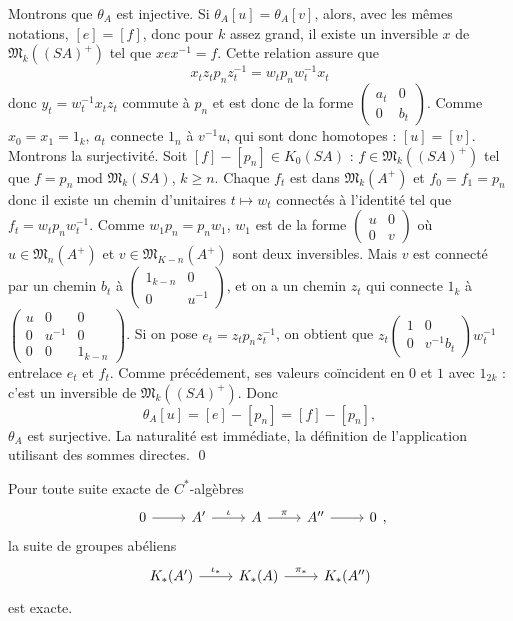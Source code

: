 \begin{dem}
Montrons que $\theta_A$ est injective. Si $\theta_A [u]=\theta_A [v]$, alors, avec les mêmes notations, $[e]=[f]$, donc pour $k$ assez grand, il existe un inversible $x$ de $\mathfrak M_k((SA)^+)$ tel que $xex^{-1}=f$. Cette relation assure que 
\[ x_t z_t p_n z_t^{-1}  = w_t p_n w_t^{-1} x_t \]
donc $y_t= w_t^{-1} x_t z_t $ commute à $p_n$ et est donc de la forme $\begin{pmatrix} a_t & 0 \\ 0 & b_t\end{pmatrix}$. Comme $x_0=x_1=1_k$, $a_t$ connecte $1_n$ à $v^{-1} u$, qui sont donc homotopes : $[u]=[v]$.\\

Montrons la surjectivité. Soit $[f]-[p_n]\in K_0(SA)$ : $f\in \mathfrak M_k ((SA)^+)$ tel que $f=p_n \ \text{mod } \mathfrak M_k(SA)$, $k\geq n$. Chaque $f_t$ est dans $\mathfrak M_k(A^+)$ et $f_0=f_1=p_n$ donc il existe un chemin d'unitaires $t \mapsto w_t$ connectés à l'identité tel que $f_t = w_t p_n w^{-1}_t$. Comme $w_1 p_n = p_n w_1$, $w_1$ est de la forme $\begin{pmatrix}u & 0\\ 0 & v\end{pmatrix}$ où $u \in \mathfrak M_{n}(A^+)$ et $v \in \mathfrak M_{K-n}(A^+)$ sont deux inversibles. Mais $v$ est connecté par un chemin $b_t$ à $\begin{pmatrix}1_{k-n} & 0\\ 0 & u^{-1}\end{pmatrix}$, et on a un chemin $z_t$ qui connecte $1_k$ à $\begin{pmatrix} u & 0 & 0 \\ 0 & u^{-1} & 0\\ 0 & 0 & 1_{k-n}\end{pmatrix}$. Si on pose $e_t = z_t p_n z_t^{-1}$, on obtient que $z_t \begin{pmatrix}1 & 0 \\ 0 & v^{-1} b_t \end{pmatrix}w_t^{-1}$ entrelace $e_t$ et $f_t$. Comme précédement, ses valeurs coïncident en $0$ et $1$ avec $1_{2k}$ : c'est un inversible de $\mathfrak M_k ((SA)^+)$. Donc 
\[\theta_A [u] = [e]-[p_n]= [f]-[p_n],\]
$\theta_A$ est surjective. La naturalité est immédiate, la définition de l'application utilisant des sommes directes.
\qed
\end{dem}

\begin{thm}
Pour toute suite exacte de $C^*$-algèbres \[\begin{tikzcd}[row sep = small] 0\arrow{r} & A' \arrow{r}{\iota} & A\arrow{r}{\pi} & A''\arrow{r} & 0\end{tikzcd},\] la suite de groupes abéliens
\[\begin{tikzcd} K_*(A') \arrow{r}{\iota_*} & K_*(A)\arrow{r}{\pi_*} & K_*(A'')\end{tikzcd}\] est exacte.
\end{thm}

